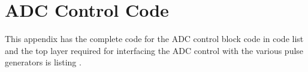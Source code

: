\chapter{ADC Control Code} \label{App:ADCControlCode}
This appendix has the complete code for the ADC control block code in code list  and the top layer required for interfacing the ADC control with the various pulse generators is listing .



